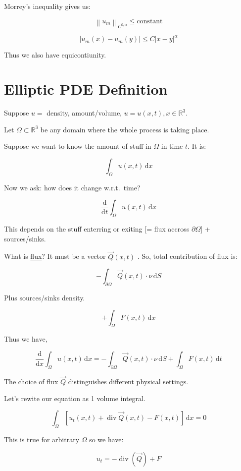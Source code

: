 \documentclass{article}
\theoremstyle{definition}
\begin{document}
Morrey's inequality gives us:

\[
    \left\lVert u_m \right\rVert _{C^{0,\alpha}} \leq \text{constant}
\]

\[
    \vert u_m(x) - u_m(y) \vert \leq C \vert x-y \vert ^ \alpha
\]

Thus we also have equicontiunity.

\section*{Elliptic PDE Definition}

Suppose \(u =\) density, amount/volume, \(u = u(x,t), x\in\mathbb{R}^3\). 

Let \(\Omega \subset \mathbb{R}^3\) be any domain where the whole process is taking place.

Suppose we want to know the amount of stuff in \(\Omega\) in time \(t\). It is:

\[
    \int_ \Omega u(x,t) \, \mathrm{d}x
\]

Now we ask: how does it change w.r.t.\ time?

\[
    \frac{\mathrm{d}}{\mathrm{d}t} \int_{\Omega}^{} u(x,t) \,\mathrm{d}x 
\]

This depends on the stuff enterring or exiting [= flux accross \(\partial \Omega\)] + sources/sinks. 

What is \underline{flux}? It must be a vector \(\vec{Q} (x,t)\) . So, total contribution of flux is:

\[
    -\int_{\partial \Omega}^{} \vec{Q} (x,t)\cdot\nu \,\mathrm{d}S 
\]

Plus sources/sinks density.

\[
    + \int_{\Omega}^{} F(x,t) \,\mathrm{d}x 
\]

Thus we have,

\[
    \frac{\mathrm{d}}{\mathrm{d}x} \int_{\Omega}^{} u(x,t) \,\mathrm{d}x = -\int_{\partial \Omega}^{} \vec{Q} (x,t) \cdot \nu \,\mathrm{d}S + \int_{\Omega}^{} F(x,t) \,\mathrm{d}t  
\]

The choice of flux \(\vec{Q}\) distinguishes different physical settings.

Let's rewite our equation as 1 volume integral.

\[
    \int_{\Omega}^{} \left[ u_t(x,t) + \operatorname{div} \vec{Q}(x,t) - F(x,t) \right]  \,\mathrm{d}x = 0
\]

This is true for arbitrary \(\Omega\) so we have:

\[
    u_t = -\operatorname{div}(\vec{Q}) + F
\]
\end{document}
